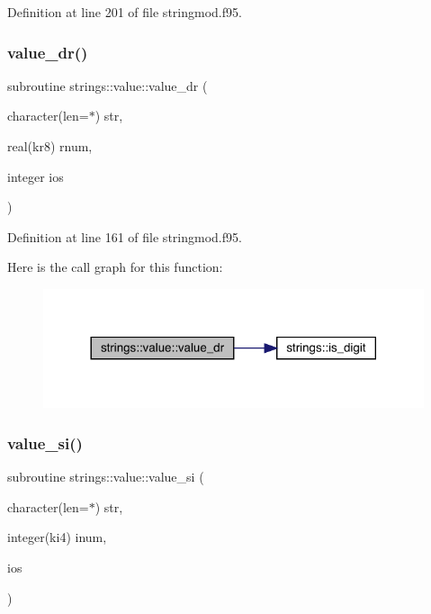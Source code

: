 Definition at line 201 of file stringmod.\+f95.

\mbox{\label{interfacestrings_1_1value_a8c03ca7c04583872ec5501088bea2e5b}} 
\subsubsection{\texorpdfstring{value\+\_\+dr()}{value\_dr()}}
{\footnotesize\ttfamily subroutine strings\+::value\+::value\+\_\+dr (\begin{DoxyParamCaption}\item[{character(len=$\ast$)}]{str,  }\item[{real(kr8)}]{rnum,  }\item[{integer}]{ios }\end{DoxyParamCaption})}



Definition at line 161 of file stringmod.\+f95.

Here is the call graph for this function\+:\nopagebreak
\begin{figure}[H]
\begin{center}
\leavevmode
\includegraphics[width=317pt]{interfacestrings_1_1value_a8c03ca7c04583872ec5501088bea2e5b_cgraph}
\end{center}
\end{figure}
\mbox{\label{interfacestrings_1_1value_a702d7223cac0986148075c7e9c889fb8}} 
\subsubsection{\texorpdfstring{value\+\_\+si()}{value\_si()}}
{\footnotesize\ttfamily subroutine strings\+::value\+::value\+\_\+si (\begin{DoxyParamCaption}\item[{character(len=$\ast$)}]{str,  }\item[{integer(ki4)}]{inum,  }\item[{}]{ios }\end{DoxyParamCaption})}




